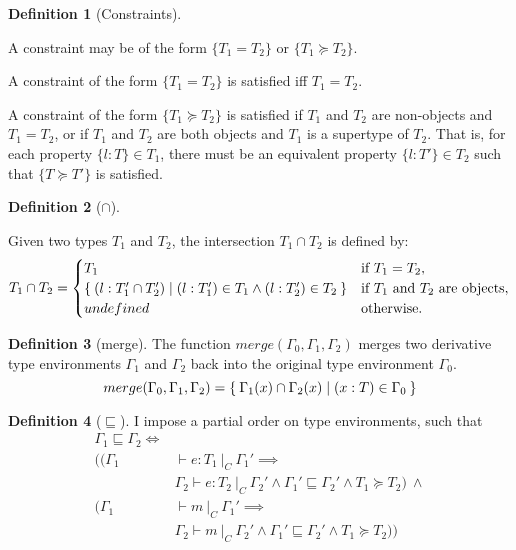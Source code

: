 \documentclass[a4paper]{article}
\theoremstyle{definition}
\newtheorem{definition}{Definition}[section]
\theoremstyle{dotless}
\begin{document}
\begin{definition}[Constraints]\label{constraintsDefn}

  A constraint may be of the form $\{T_1 = T_2\}$ or $\{T_1 \succeq T_2\}$.

  A constraint of the form $\{T_1 = T_2\}$ is satisfied iff $T_1 = T_2$.

  A constraint of the form $\{T_1 \succeq T_2\}$ is satisfied if $T_1$ and
  $T_2$ are non-objects and $T_1 = T_2$, or if $T_1$ and $T_2$ are both
  objects and $T_1$ is a supertype of $T_2$. That is, for each property
  $\{l:T\} \in T_1$, there must be an equivalent property $\{l: T'\} \in T_2$ such
  that $\{T \succeq T'\}$ is satisfied.

\end{definition}

\begin{definition}[$\cap$]\label{typeIntersect}

  Given two types $T_1$ and $T_2$, the intersection $T_1\cap T_2$ is defined by:
  \begin{equation}\label{intersect-eqn}
  	T_1\cap T_2 = 
  	\begin{cases}
  	  T_1 & \text{if $T_1 = T_2$}, \\
  	  \Set{(l:T_1'\cap T_2') | (l:T_1') \in T_1 \land (l:T_2') \in T_2} & \text{if $T_1$ and $T_2$ are objects}, \\
  	  undefined & \text{otherwise.}
  	\end{cases}
  \end{equation}

\end{definition}

\begin{definition}[merge]\label{merge}
  The function $merge(\Gamma_0, \Gamma_1, \Gamma_2)$ merges two derivative type environments $\Gamma_1$ and $\Gamma_2$ back into the original type environment $\Gamma_0$.
  \begin{equation} \label{merge-eqn}
	merge (\Gamma_0, \Gamma_1, \Gamma_2) = \Set{ \Gamma_1(x) \cap \Gamma_2(x) | (x: T) \in \Gamma_0 }
  \end{equation}
\end{definition}

\begin{definition}[$\sqsubseteq$]
  I impose a partial order on type environments, such that
  \begin{equation} \label{less-typed-eqn}
  	\begin{split}
	\Gamma_1 \sqsubseteq \Gamma_2 \iff &\\
		\big(( \Gamma_1 &\vdash e : T_1\ |_C\ \Gamma_1' \implies\\
			&\Gamma_2 \vdash e : T_2\ |_C\ \Gamma_2' \land \Gamma_1' \sqsubseteq \Gamma_2' \land T_1 \succeq T_2 )\ \land\\
		( \Gamma_1 &\vdash m\ |_C\ \Gamma_1' \implies\\
			&\Gamma_2 \vdash m\ |_C\ \Gamma_2' \land \Gamma_1' \sqsubseteq \Gamma_2' \land T_1 \succeq T_2 ) \big)\\
  	\end{split}
  \end{equation}
\end{definition}
\end{document}
